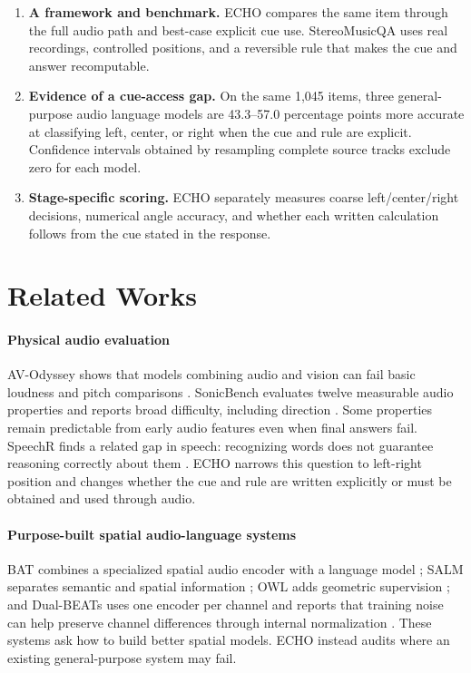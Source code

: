 \documentclass{article}
\providecommand{\tightlist}{%
  \setlength{\itemsep}{0pt}\setlength{\parskip}{0pt}}
\begin{document}
\begin{enumerate}
\def\labelenumi{\arabic{enumi}.}
\tightlist
\item
    \textbf{A framework and benchmark.} ECHO compares the same item through the full audio path and best-case explicit cue use. StereoMusicQA uses real recordings, controlled positions, and a reversible rule that makes the cue and answer recomputable.
\item
    \textbf{Evidence of a cue-access gap.} On the same 1,045 items, three general-purpose audio language models are 43.3--57.0 percentage points more accurate at classifying left, center, or right when the cue and rule are explicit. Confidence intervals obtained by resampling complete source tracks exclude zero for each model.
\item
    \textbf{Stage-specific scoring.} ECHO separately measures coarse left/center/right decisions, numerical angle accuracy, and whether each written calculation follows from the cue stated in the response.
\end{enumerate}

\section{Related Works}

\paragraph{Physical audio evaluation}
AV-Odyssey shows that models combining audio and vision can fail basic loudness and pitch comparisons \citep{gong2024avodyssey}. SonicBench evaluates twelve measurable audio properties and reports broad difficulty, including direction \citep{sun2026sonicbench}. Some properties remain predictable from early audio features even when final answers fail. SpeechR finds a related gap in speech: recognizing words does not guarantee reasoning correctly about them \citep{yang2025speechr}. ECHO narrows this question to left-right position and changes whether the cue and rule are written explicitly or must be obtained and used through audio.

\paragraph{Purpose-built spatial audio-language systems}
BAT combines a specialized spatial audio encoder with a language model \citep{zheng2024bat}; SALM separates semantic and spatial information \citep{hu2025salm}; OWL adds geometric supervision \citep{biswas2025owl}; and Dual-BEATs uses one encoder per channel and reports that training noise can help preserve channel differences through internal normalization \citep{lin2026dualbeats}. These systems ask how to build better spatial models. ECHO instead audits where an existing general-purpose system may fail.
\end{document}
